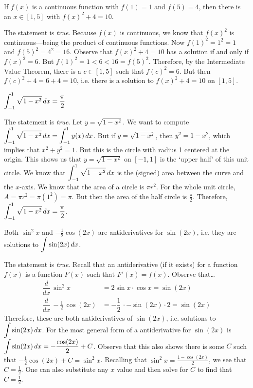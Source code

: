 \documentclass[11pt,letterpaper]{article}
\begin{document}
 If $f(x)$ is a continuous function with $f(1)= 1$ and $f(5)= 4$, then there is an $x \in [1, 5]$ with $f(x)^2 + 4= 10$.  \pspace

\sol The statement is \textit{true}. Because $f(x)$ is continuous, we know that $f(x)^2$ is continuous---being the product of continuous functions. Now $f(1)^2= 1^2= 1$ and $f(5)^2= 4^2= 16$. Observe that $f(x)^2 + 4= 10$ has a solution if and only if $f(x)^2= 6$. But $f(1)^2= 1 < 6 < 16= f(5)^2$. Therefore, by the Intermediate Value Theorem, there is a $c \in [1, 5]$ such that $f(c)^2= 6$. But then $f(c)^2 + 4= 6 + 4= 10$, i.e. there is a solution to $f(x)^2 + 4= 10$ on $[1, 5]$. 



\newpage



 $\displaystyle\int_{-1}^1 \sqrt{1 - x^2} \,dx= \frac{\pi}{2}$  \pspace

\sol The statement is \textit{true}. Let $y= \sqrt{1 - x^2}$. We want to compute $\displaystyle\int_{-1}^1 \sqrt{1 - x^2} \,dx= \int_{-1}^1 y(x) \,dx$. But if $y= \sqrt{1 - x^2}$, then $y^2= 1 - x^2$, which implies that $x^2 + y^2= 1$. But this is the circle with radius 1 centered at the origin. This shows us that $y= \sqrt{1 - x^2}$ on $[-1, 1]$ is the `upper half' of this unit circle. We know that $\displaystyle\int_{-1}^1 \sqrt{1 - x^2} \,dx$ is the (signed) area between the curve and the $x$-axis. We know that the area of a circle is $\pi r^2$. For the whole unit circle, $A= \pi r^2= \pi (1^2)= \pi$. But then the area of the half circle is $\frac{\pi}{2}$. Therefore, $\displaystyle\int_{-1}^1 \sqrt{1 - x^2} \,dx= \frac{\pi}{2}$. \pvspace{1.3cm}



 Both $\sin^2 x$ and $-\frac{1}{2} \cos(2x)$ are antiderivatives for $\sin(2x)$, i.e. they are solutions to $\displaystyle\int \sin(2x) \,dx$. \pspace

\sol The statement is \textit{true}. Recall that an antiderivative (if it exists) for a function $f(x)$ is a function $F(x)$ such that $F'(x)= f(x)$. Observe that\dots
	\[
	\begin{aligned}
	\dfrac{d}{dx} \, \sin^2 x&= 2 \sin x \cdot \cos x= \sin(2x) \\[0.3cm]
	\dfrac{d}{dx} \, -\frac{1}{2}\, \cos(2x)&= -\dfrac{1}{2}\, \cdot -\sin(2x) \cdot 2= \sin(2x)
	\end{aligned}
	\]
Therefore, these are both antiderivatives of $\sin(2x)$, i.e. solutions to $\displaystyle\int \sin(2x) \,dx$. For the most general form of a antiderivative for $\sin(2x)$ is $\displaystyle\int \sin(2x) \,dx= -\dfrac{\cos(2x)}{2} + C$. Observe that this also shows there is some $C$ such that $-\frac{1}{2} \cos(2x) + C= \sin^2 x$. Recalling that $\sin^2 x= \frac{1 - \cos(2x)}{2}$, we see that $C= \frac{1}{2}$. One can also substitute any $x$ value and then solve for $C$ to find that $C= \frac{1}{2}$. \pvspace{1.3cm}
\end{document}
